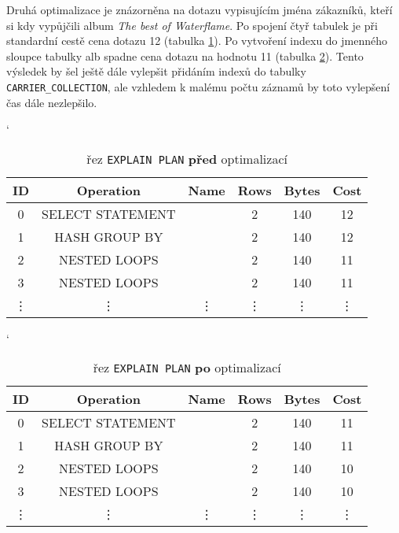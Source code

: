 \documentclass{article}
\begin{document}
\newpage
Druhá optimalizace je znázorněna na dotazu vypisujícím jména zákazníků, kteří si kdy vypůjčili album \textit{The best of Waterflame}. Po spojení čtyř tabulek je při standardní cestě  cena dotazu 12 (tabulka \ref{tab3}). Po vytvoření indexu do jmenného sloupce tabulky alb spadne cena dotazu na hodnotu 11 (tabulka \ref{tab4}). Tento výsledek by šel ještě dále vylepšit přidáním indexů do tabulky \texttt{CARRIER\_COLLECTION}, ale vzhledem k malému počtu záznamů by toto vylepšení čas dále nezlepšilo.

\begin{table}[h]
    \centering \catcode`
    \begin{tabular}{|c|c|c|c|c|c|}
        \hline
        \textbf{ID} & \textbf{Operation} & \textbf{Name} & \textbf{Rows} & \textbf{Bytes} & \textbf{Cost} \\ \hline
        0 & SELECT STATEMENT & & 2 & 140 & {\color{red} 12} \\ 
        1 & HASH GROUP BY & & 2 & 140 & 12 \\
        2 & NESTED LOOPS & & 2 & 140 & 11 \\
        3 & NESTED LOOPS & & 2 & 140 & 11 \\ \hline
        \vdots & \vdots & \vdots & \vdots & \vdots & \vdots \\
        \hline
    \end{tabular}
    \caption{řez \texttt{EXPLAIN PLAN} \textbf{před} optimalizací}
    \label{tab3}
\end{table}

\begin{table}[h]
    \centering \catcode`
    \begin{tabular}{|c|c|c|c|c|c|}
        \hline
        \textbf{ID} & \textbf{Operation} & \textbf{Name} & \textbf{Rows} & \textbf{Bytes} & \textbf{Cost} \\ \hline
        0 & SELECT STATEMENT & & 2 & 140 & {\color{red} 11} \\ 
        1 & HASH GROUP BY & & 2 & 140 & 11 \\
        2 & NESTED LOOPS & & 2 & 140 & 10 \\
        3 & NESTED LOOPS & & 2 & 140 & 10 \\ \hline
        \vdots & \vdots & \vdots & \vdots & \vdots & \vdots \\
        \hline
    \end{tabular}
    \caption{řez \texttt{EXPLAIN PLAN} \textbf{po} optimalizací}
    \label{tab4}
\end{table}
\end{document}

